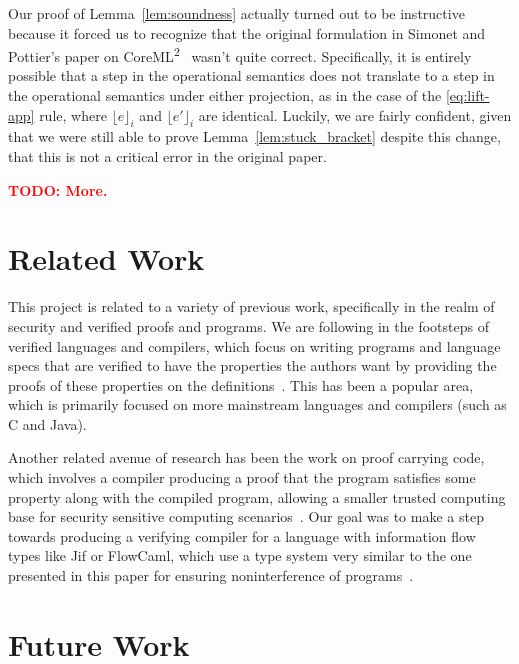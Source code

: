\documentclass[a4paper,twocolumn]{article}
\newcommand{\origLang}[0]{CoreML\textsuperscript{2}}
\newcommand{\lift}[1]{\lfloor #1 \rfloor}
\newcommand{\todo}[1]{\textbf{\textcolor{red}{TODO: #1}}}
\theoremstyle{plain}
\theoremstyle{definition}
\begin{document}
Our proof of Lemma~\ref{lem:soundness} actually turned out to be instructive
because it forced us to recognize that the original formulation in Simonet and
Pottier's paper on \origLang~\cite{InfoFlowML} wasn't quite correct.
Specifically, it is entirely possible that a step in the operational semantics
does not translate to a step in the operational semantics under either
projection, as in the case of the \ref{eq:lift-app} rule, where $\lift{e}_i$ and
$\lift{e'}_i$ are identical.  Luckily, we are fairly confident, given that we
were still able to prove Lemma~\ref{lem:stuck_bracket} despite this change, that
this is not a critical error in the original paper.

\todo{More.}

\section{Related Work}
\label{sec:related}

This project is related to a variety of previous work, specifically in the realm
of security and verified proofs and programs.  We are following in the footsteps
of verified languages and compilers, which focus on writing programs and
language specs that are verified to have the properties the authors want by
providing the proofs of these properties on the
definitions~\cite{strecker2002formal,leinenbach2005towards,dave2003compiler,leroy2009formally,leroy2006formal,leroy2009formal,leroy2012compcert,chlipala2010verified,berghofer2004extracting}.
This has been a popular area, which is primarily focused on more mainstream
languages and compilers (such as C and Java).

Another related avenue of research has been the work on proof carrying code,
which involves a compiler producing a proof that the program satisfies some
property along with the compiled program, allowing a smaller trusted computing
base for security sensitive computing
scenarios~\cite{necula2002proof,necula1998design}.  Our goal was to make a step
towards producing a verifying compiler for a language with information flow
types like Jif or FlowCaml, which use a type system very similar to the one
presented in this paper for ensuring noninterference of
programs~\cite{InfoFlowML,myers1999jflow}.

\section{Future Work}
\label{sec:future}
\end{document}
